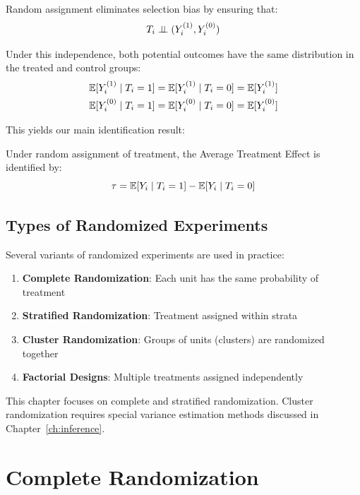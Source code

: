 Random assignment eliminates selection bias by ensuring that:
\begin{equation}
T_i \perp\!\!\!\perp (Y^{(1)}_i, Y^{(0)}_i)
\end{equation}

Under this independence, both potential outcomes have the same distribution in the treated and control groups:
\begin{align}
\mathbb{E}[Y^{(1)}_i \mid T_i = 1] &= \mathbb{E}[Y^{(1)}_i \mid T_i = 0] = \mathbb{E}[Y^{(1)}_i] \\
\mathbb{E}[Y^{(0)}_i \mid T_i = 1] &= \mathbb{E}[Y^{(0)}_i \mid T_i = 0] = \mathbb{E}[Y^{(0)}_i]
\end{align}

This yields our main identification result:

\begin{theorem}
\label{thm:rct_id}
Under random assignment of treatment, the Average Treatment Effect is identified by:
\begin{equation}
\tau = \mathbb{E}[Y_i \mid T_i = 1] - \mathbb{E}[Y_i \mid T_i = 0]
\end{equation}
\end{theorem}

\subsection{Types of Randomized Experiments}

Several variants of randomized experiments are used in practice:

\begin{enumerate}
    \item \textbf{Complete Randomization}: Each unit has the same probability of treatment
    \item \textbf{Stratified Randomization}: Treatment assigned within strata
    \item \textbf{Cluster Randomization}: Groups of units (clusters) are randomized together
    \item \textbf{Factorial Designs}: Multiple treatments assigned independently
\end{enumerate}

This chapter focuses on complete and stratified randomization. Cluster randomization requires special variance estimation methods discussed in Chapter~\ref{ch:inference}.


\section{Complete Randomization}
\label{sec:complete_random}

